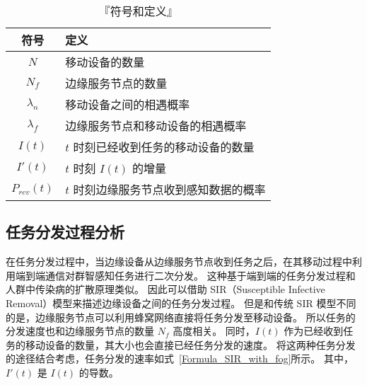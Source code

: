 \begin{table}[h]
  \vspace{-1.5em}
  \caption{『符号和定义』}
  \vspace{-0.5em}
  \centering
  \label{table_notations}
  \begin{tabular}{|c|p{7cm}|}
  \hline
  \textbf{符号} & \textbf{定义}\\
  \hline
  $N$ & 移动设备的数量\\\hline
  $N_f$ & 边缘服务节点的数量\\\hline
  $\lambda_n$ & 移动设备之间的相遇概率\\\hline
  $\lambda_f$ & 边缘服务节点和移动设备的相遇概率\\\hline
  $I(t)$ & $t$ 时刻已经收到任务的移动设备的数量\\\hline
  $I'(t)$ & $t$ 时刻 $I(t)$ 的增量\\\hline
  $P_{rcv}(t)$ & $t$ 时刻边缘服务节点收到感知数据的概率\\\hline
  \end{tabular}
  \vspace{-1em}
\end{table}

\subsection{任务分发过程分析}


在任务分发过程中，当边缘设备从边缘服务节点收到任务之后，在其移动过程中利用端到端通信对群智感知任务进行二次分发。
这种基于端到端的任务分发过程和人群中传染病的扩散原理类似。
因此可以借助 SIR（Susceptible Infective Removal）模型来描述边缘设备之间的任务分发过程。
但是和传统 SIR 模型不同的是，边缘服务节点可以利用蜂窝网络直接将任务分发至移动设备。
所以任务的分发速度也和边缘服务节点的数量 $N_f$ 高度相关。
同时，$I(t)$ 作为已经收到任务的移动设备的数量，其大小也会直接已经任务分发的速度。
将这两种任务分发的途径结合考虑，任务分发的速率如式~\eqref{Formula_SIR_with_fog}所示。
其中，$I'(t)$ 是 $I(t)$ 的导数。


